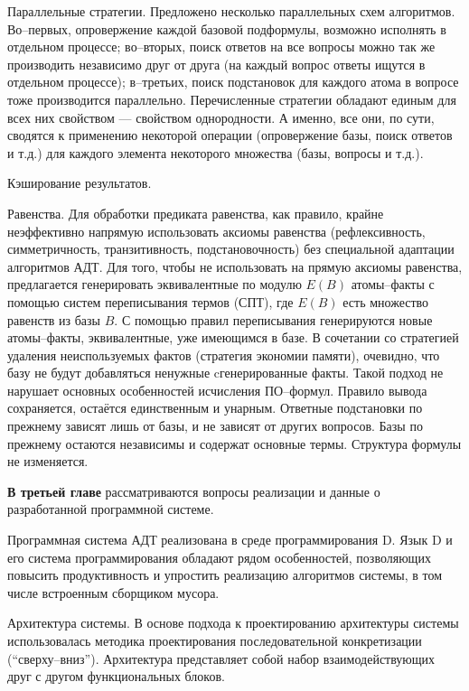 \documentclass[a4paper]{report}
\begin{document}
Параллельные стратегии. Предложено несколько параллельных схем алгоритмов. Во--первых, опровержение каждой базовой подформулы, возможно исполнять в отдельном процессе; во--вторых, поиск ответов на все вопросы можно так же производить независимо друг от друга (на каждый вопрос ответы ищутся в отдельном процессе); в--третьих, поиск подстановок для каждого атома в вопросе тоже производится параллельно. Перечисленные стратегии обладают единым для всех них свойством --- свойством однородности. А именно, все они, по сути, сводятся к применению некоторой операции (опровержение базы, поиск ответов и т.д.) для каждого элемента некоторого множества (базы, вопросы и т.д.).

Кэширование результатов.

Равенства. Для обработки предиката равенства, как правило, крайне неэффективно напрямую использовать аксиомы равенства (рефлексивность, симметричность, транзитивность, подстановочность) без специальной адаптации алгоритмов АДТ. Для того, чтобы не использовать на прямую аксиомы равенства, предлагается генерировать эквивалентные по модулю $E(B)$ атомы--факты с помощью систем переписывания термов (СПТ), где $E(B)$ есть множество равенств из базы $B$. С помощью правил переписывания генерируются новые атомы--факты, эквивалентные, уже имеющимся в базе. В сочетании со стратегией удаления неиспользуемых фактов (стратегия экономии памяти), очевидно, что базу не будут добавляться ненужные cгенерированные факты. Такой подход не нарушает основных особенностей исчисления ПО--формул. Правило вывода сохраняется, остаётся единственным и унарным. Ответные подстановки по прежнему зависят лишь от базы, и не зависят от других вопросов. Базы по прежнему остаются независимы и содержат основные термы. Структура формулы не изменяется.




\textbf{В третьей главе} рассматриваются вопросы реализации и данные о разработанной программной системе.

Программная система АДТ реализована в среде программирования D. Язык D и его система программирования обладают рядом особенностей, позволяющих повысить продуктивность и упростить реализацию алгоритмов системы, в том числе встроенным сборщиком мусора.

Архитектура системы. В основе подхода к проектированию архитектуры системы использовалась методика проектирования последовательной конкретизации (``сверху--вниз''). Архитектура представляет собой набор взаимодействующих друг с другом функциональных блоков.
\end{document}
